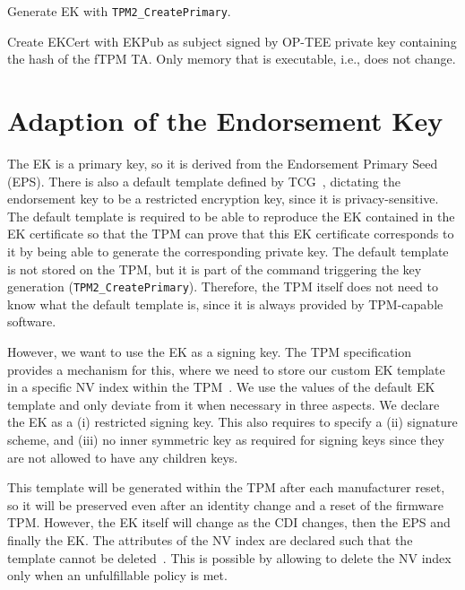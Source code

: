 Generate EK with \texttt{TPM2\_CreatePrimary}.

Create EKCert with EKPub as subject signed by OP-TEE private key containing the hash of the fTPM TA\@.
Only memory that is executable, i.e., does not change.



\section{Adaption of the Endorsement Key}

The EK is a primary key, so it is derived from the Endorsement Primary Seed (EPS).
There is also a default template defined by TCG~\cite{tcg-ek}, dictating the endorsement key to be a restricted encryption key, since it is privacy-sensitive.
The default template is required to be able to reproduce the EK contained in the EK certificate so that the TPM can prove that this EK certificate corresponds to it by being able to generate the corresponding private key.
The default template is not stored on the TPM, but it is part of the command triggering the key generation (\texttt{TPM2\_CreatePrimary}).
Therefore, the TPM itself does not need to know what the default template is, since it is always provided by TPM-capable software.

However, we want to use the EK as a signing key.
The TPM specification provides a mechanism for this, where we need to store our custom EK template in a specific NV index within the TPM~\cite{tcg-ek}.
We use the values of the default EK template and only deviate from it when necessary in three aspects.
We declare the EK as a (i) restricted signing key.
This also requires to specify a (ii) signature scheme, and (iii) no inner symmetric key as required for signing keys since they are not allowed to have any children keys.

This template will be generated within the TPM after each manufacturer reset, so it will be preserved even after an identity change and a reset of the firmware TPM\@.
However, the EK itself will change as the CDI changes, then the EPS and finally the EK\@.
The attributes of the NV index are declared such that the template cannot be deleted~\cite{tcgPcClient}.
This is possible by allowing to delete the NV index only when an unfulfillable policy is met.


